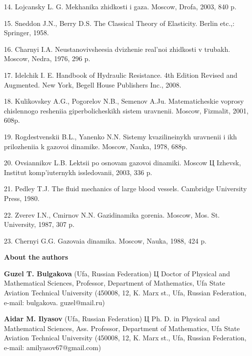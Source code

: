 14.	Lojcansky L. G. Mekhanika zhidkosti i gaza. Moscow, Drofa, 2003, 840 p.



15.	Sneddon J.N., Berry D.S. The Classical Theory of Elasticity. Berlin etc.,: Springer, 1958.  



16.	Charnyi I.A. Neustanovivsheesia dvizhenie real'noi zhidkosti v trubakh. Moscow, Nedra, 1976, 296 p.



17.	Idelchik I. E. Handbook of Hydraulic Resistance. 4th Edition Revised and Augmented. New York, Begell House Publishers Inc., 2008.



18.	Kulikovskey A.G., Pogorelov N.B., Semenov A.Ju. Matematicheskie voprosy chislennogo resheniia giperbolicheskikh sistem uravnenii. Moscow, Fizmalit, 2001, 608p.



19.	Rogdestvenskii B.L., Yanenko N.N. Sistemy kvazilineinykh uravnenii i ikh prilozheniia k gazovoi dinamike. Moscow, Nauka, 1978, 688p.



20.	Ovsiannikov L.B. Lektsii po osnovam gazovoi dinamiki. Moscow Ц Izhevsk, Institut komp'iuternykh issledovanii, 2003, 336 p.



21.	Pedley T.J. The fluid mechanics of large blood vessels. Cambridge University Press, 1980.



22.	Zverev I.N., Cmirnov N.N. Gazidinamika gorenia. Moscow, Mos. St. University, 1987, 307 p.



23.	Chernyi G.G. Gazovaia dinamika. Moscow, Nauka, 1988, 424 p.





\begin{center}


\textbf{About the authors}


\end{center}



\textbf{Guzel T. Bulgakova} (Ufa, Russian Federation) Ц Doctor of Physical and Mathematical Sciences, Professor, Department of Mathematics, Ufa State Aviation Technical University (450008, 12, K. Marx st., Ufa, Russian Federation, e-mail: bulgakova. guzel@mail.ru)



\textbf{Aidar M. Ilyasov} (Ufa, Russian Federation) Ц Ph. D. in Physical and Mathematical Sciences, Ass. Professor, Department of Mathematics, Ufa State Aviation Technical University (450008, 12, K. Marx st., Ufa, Russian Federation, e-mail: amilyasov67@gmail.com)





